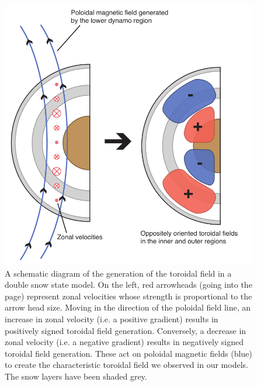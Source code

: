 \begin{figure}
	\centering
	\noindent\includegraphics[width=30pc]{Chapter4/figures/Schematic-Toroidal.pdf}
	\caption{A schematic diagram of the generation of the toroidal field in a double snow state model. On the left, red arrowheads (going into the page) represent zonal velocities whose strength is proportional to the arrow head size. Moving in the direction of the poloidal field line, an increase in zonal velocity (i.e. a positive gradient) results in  positively signed toroidal field generation. Conversely, a decrease in zonal velocity (i.e. a negative gradient) results in negatively signed toroidal field generation. These act on poloidal magnetic fields (blue) to create the characteristic toroidal field we observed in our models. The snow layers have been shaded grey.}
	\label{fig:schematictoroidal}
\end{figure}

